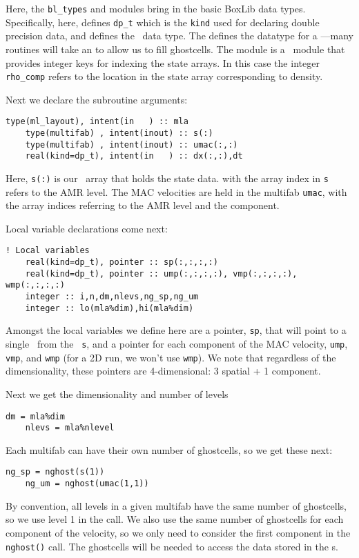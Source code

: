 \noindent Here, the {\tt bl\_types} and 
modules bring in the basic BoxLib data types. Specifically, here,
 defines {\tt dp\_t} which is the {\tt kind} used for
declaring double precision data, and  defines
the \multifab\ data type.  The  defines the
datatype for a \mllayout---many routines will take an \mllayout to
allow us to fill ghostcells.  The  module is a
\maestro\ module that provides integer keys for indexing the state
arrays.  In this case the integer {\tt rho\_comp} refers to the
location in the state array corresponding to density.

Next we declare the subroutine arguments:

\begin{lstlisting}[language={[95]fortran},mathescape=false]
    type(ml_layout), intent(in   ) :: mla
    type(multifab) , intent(inout) :: s(:)
    type(multifab) , intent(inout) :: umac(:,:)
    real(kind=dp_t), intent(in   ) :: dx(:,:),dt
\end{lstlisting}
Here, {\tt s(:)} is our \multifab\ array that holds the state data.
with the array index in {\tt s} refers to the AMR level.  The MAC 
velocities are held in the multifab {\tt umac}, with the array
indices referring to the AMR level and the component.


Local variable declarations come next:
\begin{lstlisting}[language={[95]fortran},mathescape=false]
    ! Local variables
    real(kind=dp_t), pointer :: sp(:,:,:,:)
    real(kind=dp_t), pointer :: ump(:,:,:,:), vmp(:,:,:,:), wmp(:,:,:,:)
    integer :: i,n,dm,nlevs,ng_sp,ng_um
    integer :: lo(mla%dim),hi(mla%dim)
\end{lstlisting}

\noindent Amongst the local variables we define here are a pointer,
{\tt sp}, that will point to a single \fab\ from the
\multifab\ {\tt s}, and a pointer for each component of the MAC
velocity, {\tt ump}, {\tt vmp}, and {\tt wmp} (for a 2D run,
we won't use {\tt wmp}).  We note that regardless of the dimensionality,
these pointers are 4-dimensional: 3 spatial + 1 component.

Next we get the dimensionality and number of levels
\begin{lstlisting}[language={[95]fortran},mathescape=false]
    dm = mla%dim
    nlevs = mla%nlevel
\end{lstlisting}


Each multifab can have their own number of ghostcells, so we get
these next:
\begin{lstlisting}[language={[95]fortran},mathescape=false]
    ng_sp = nghost(s(1))
    ng_um = nghost(umac(1,1))
\end{lstlisting}
By convention, all levels in a given multifab have the same number of
ghostcells, so we use level 1 in the  call.  We also use
the same number of ghostcells for each component of the velocity, so
we only need to consider the first component in the {\tt nghost()}
call.  The ghostcells will be needed to access the data stored in the
\fab s.

